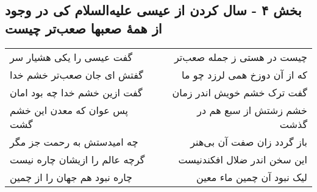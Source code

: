 \begin{center}
\section*{بخش ۴ - سال کردن از عیسی علیه‌السلام کی در وجود از همهٔ صعبها صعب‌تر چیست}
\label{sec:sh004}
\begin{longtable}{l p{0.5cm} r}
گفت عیسی را یکی هشیار سر
&&
چیست در هستی ز جمله صعب‌تر
\\
گفتش ای جان صعب‌تر خشم خدا
&&
که از آن دوزخ همی لرزد چو ما
\\
گفت ازین خشم خدا چه بود امان
&&
گفت ترک خشم خویش اندر زمان
\\
پس عوان که معدن این خشم گشت
&&
خشم زشتش از سبع هم در گذشت
\\
چه امیدستش به رحمت جز مگر
&&
باز گردد زان صفت آن بی‌هنر
\\
گرچه عالم را ازیشان چاره نیست
&&
این سخن اندر ضلال افکندنیست
\\
چاره نبود هم جهان را از چمین
&&
لیک نبود آن چمین ماء معین
\\
\end{longtable}
\end{center}
